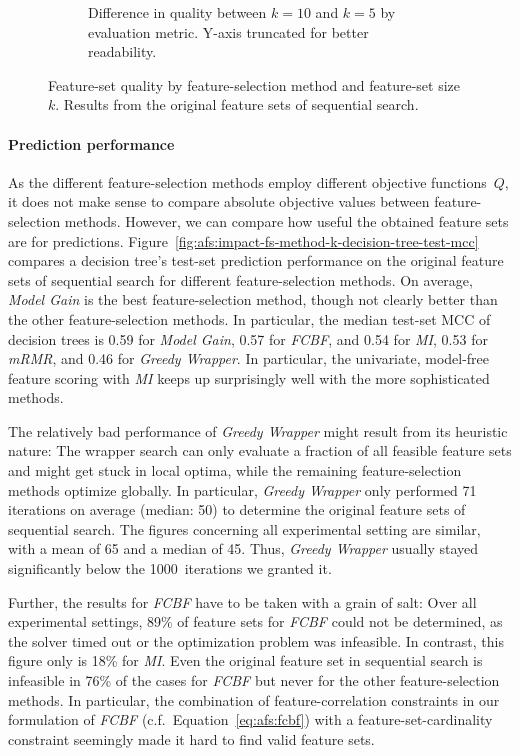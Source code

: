 \documentclass{article}
\theoremstyle{definition}
\begin{document}
\begin{figure}[htb]
\begin{subfigure}[t]{0.48\textwidth}
		\caption{
			Difference in quality between $k=10$ and $k=5$ by evaluation metric.
			Y-axis truncated for better readability.
		}
		\label{fig:afs:impact-fs-method-k-metric-diff}
	\end{subfigure}
	\caption{
		Feature-set quality by feature-selection method and feature-set size~$k$.
		Results from the original feature sets of sequential search.
	}
	\label{fig:afs:impact-fs-method-k-quality}
\end{figure}

\paragraph{Prediction performance}

As the different feature-selection methods employ different objective functions~$Q$, it does not make sense to compare absolute objective values between feature-selection methods.
However, we can compare how useful the obtained feature sets are for predictions.
Figure~\ref{fig:afs:impact-fs-method-k-decision-tree-test-mcc} compares a decision tree's test-set prediction performance on the original feature sets of sequential search for different feature-selection methods.
On average, \emph{Model Gain} is the best feature-selection method, though not clearly better than the other feature-selection methods.
In particular, the median test-set MCC of decision trees is 0.59 for \emph{Model Gain}, 0.57 for \emph{FCBF}, and 0.54 for \emph{MI}, 0.53 for \emph{mRMR}, and 0.46 for \emph{Greedy Wrapper}.
In particular, the univariate, model-free feature scoring with \emph{MI} keeps up surprisingly well with the more sophisticated methods.

The relatively bad performance of \emph{Greedy Wrapper} might result from its heuristic nature:
The wrapper search can only evaluate a fraction of all feasible feature sets and might get stuck in local optima, while the remaining feature-selection methods optimize globally.
In particular, \emph{Greedy Wrapper} only performed 71 iterations on average (median: 50) to determine the original feature sets of sequential search.
The figures concerning all experimental setting are similar, with a mean of 65 and a median of 45.
Thus, \emph{Greedy Wrapper} usually stayed significantly below the 1000~iterations we granted it.

Further, the results for \emph{FCBF} have to be taken with a grain of salt:
Over all experimental settings, 89\% of feature sets for \emph{FCBF} could not be determined, as the solver timed out or the optimization problem was infeasible.
In contrast, this figure only is 18\% for \emph{MI}.
Even the original feature set in sequential search is infeasible in 76\% of the cases for \emph{FCBF} but never for the other feature-selection methods.
In particular, the combination of feature-correlation constraints in our formulation of \emph{FCBF} (c.f.~Equation~\ref{eq:afs:fcbf}) with a feature-set-cardinality constraint seemingly made it hard to find valid feature sets.
\end{document}
